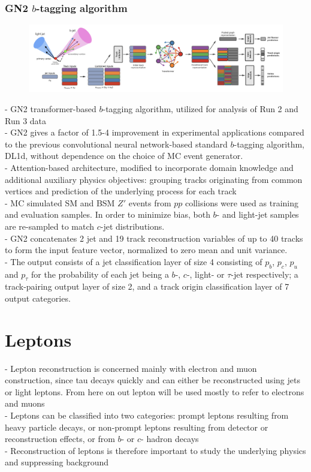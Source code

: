 \documentclass[../thesis.tex]{subfiles}
\begin{document}
\subsubsection*{GN2 $b$-tagging algorithm}
\label{sec:btag}
\begin{figure}[!htbp]
\begin{center}
\includegraphics[width=\linewidth]{fig/ftag_gn2.png}
\caption{\label{fig:ftag:gn2} \citep{ftag:gn1}\citep{ftag:gn1.1}\citep{ftag:gn2}}
\end{center}
\end{figure}

- GN2 transformer-based $b$-tagging algorithm, utilized for analysis of Run 2 and Run 3 data\\
- GN2 gives a factor of 1.5-4 improvement in experimental applications compared to the previous convolutional neural network-based standard $b$-tagging algorithm, DL1d, without dependence on the choice of MC event generator.\\
- Attention-based architecture, modified to incorporate domain knowledge and additional auxiliary physics objectives: grouping tracks originating from common vertices and prediction of the underlying process for each track\\
- MC simulated SM \ttbar and BSM $Z'$ events from $pp$ collisions were used as training and evaluation samples. In order to minimize bias, both $b$- and light-jet samples are re-sampled to match $c$-jet distributions. \\
- GN2 concatenates 2 jet and 19 track reconstruction variables of up to 40 tracks to form the input feature vector, normalized to zero mean and unit variance.\\
- The output consists of a jet classification layer of size 4 consisting of $p_b$, $p_c$, $p_u$ and $p_\tau$ for the probability of each jet being a $b$-, $c$-, light- or $\tau$-jet respectively; a track-pairing output layer of size 2, and a track origin classification layer of 7 output categories. 

\section{Leptons}
- Lepton reconstruction is concerned mainly with electron and muon construction, since tau decays quickly and can either be reconstructed using jets or light leptons. From here on out lepton will be used mostly to refer to electrons and muons\\
- Leptons can be classified into two categories: prompt leptons resulting from heavy particle decays, or non-prompt leptons resulting from detector or reconstruction effects, or from $b$- or $c$- hadron decays\\
- Reconstruction of leptons is therefore important to study the underlying physics and suppressing background
\end{document}
